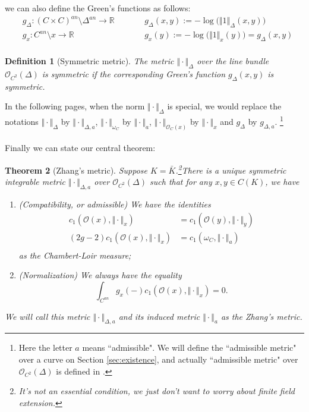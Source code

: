 \documentclass[reqno,11pt]{amsart}
\numberwithin{equation}{section}
\theoremstyle{plain}
\newtheorem{theorem}{Theorem}[section]
\newtheorem{defn}[theorem]{Definition}
\theoremstyle{plain}
\numberwithin{equation}{section}
\theoremstyle{remark}
\newcommand{\norm}[1]{\Vert{#1}\Vert}
\begin{document}
we can also define the Green's functions as follows:
\begin{equation*}
\begin{aligned}
 &g_{\Delta}:(C \times C)^{an} \setminus \Delta^{an} \longrightarrow \mathbb{R} \qquad  &&g_{\Delta}(x,y):=-\log \big(\norm{1}_{\Delta}(x,y)\big)  \\
 &g_{x}:C^{an} \setminus {x} \longrightarrow \mathbb{R} \qquad  &&g_{x}(y):=-\log \big(\norm{1}_{x}(y)\big) =g_{\Delta}(x,y) \\
\end{aligned}
\end{equation*}
\begin{defn}[Symmetric metric]
The metric $\norm{\cdot}_{\Delta}$ over the line bundle $\mathcal{O}_{C^2}(\Delta)$ is symmetric if the corresponding Green's function $g_{\Delta}(x,y)$ is symmetric.
\end{defn}
In the following pages, when the norm  $\norm{\cdot}_{\Delta}$ is special, we would replace the notations $\norm{\cdot}_{\Delta}$ by $\norm{\cdot}_{\Delta,a}$, $\norm{\cdot}_{\omega_C}$ by $\norm{\cdot}_{a}$, $\norm{\cdot}_{\mathcal{O}_C(x)}$ by $\norm{\cdot}_{x}$ and $g_{\Delta}$ by $g_{\Delta,a}$. \footnote{Here the letter $a$ means ``admissible". We will define the ``admissible metric" over a curve on Section \ref{sec:existence}, and actually ``admissible metric" over $\mathcal{O}_{C^2}(\Delta)$ is defined in \cite[Appendix A.3, p79]{yuan2021arithmetic}.}
\\
\\

Finally we can state our central theorem:
\begin{theorem}[Zhang's metric]\label{thm:main}
Suppose $K=\bar{K}$.\footnote{It's not an essential condition, we just don't want to worry about finite field extension.}There is a unique symmetric integrable metric $\norm{\cdot}_{\Delta,a}$ over $\mathcal{O}_{C^2}(\Delta)$ such that for any $x,y \in C(K)$, we have
\begin{enumerate}[(1)]
\item (Compatibility, or admissible) We have the identities
\begin{equation*}
\begin{aligned}
  c_1(\mathcal{O}(x),\norm{\cdot}_x)&=c_1(\mathcal{O}(y),\norm{\cdot}_y)  \\ 
  (2g-2)c_1(\mathcal{O}(x),\norm{\cdot}_x)&=c_1(\omega_C,\norm{\cdot}_a)  \\ 
\end{aligned}
\end{equation*}
as the Chambert-Loir measure;
\item (Normalization) We always have the equality
$$\int_{C^{an}} g_x(-) c_1(\mathcal{O}(x),\norm{\cdot}_x) =0.$$
\end{enumerate}
We will call this metric $\norm{\cdot}_{\Delta,a}$ and its induced metric $\norm{\cdot}_{a}$ as the Zhang's metric.
\end{theorem}
\end{document}
